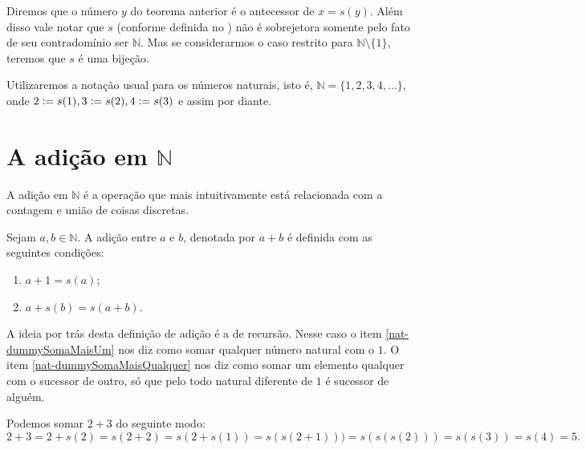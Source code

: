 \documentclass[../main.tex]{subfiles}
\begin{document}
\begin{obs}
    Diremos que o número $y$ do teorema anterior é o antecessor de $x = s(y)$. Além disso vale notar que $s$ (conforme definida no ) não é sobrejetora somente pelo fato de seu contradomínio ser $\mathbb{N}$. Mas se considerarmos o caso restrito para $\mathbb{N} \setminus \{1\}$, teremos que $s$ é uma bijeção.
\end{obs}

Utilizaremos a notação usual para os números naturais, isto é, $\mathbb{N} = \{ 1, 2, 3, 4, ...\}$, onde $2 \vcentcolon= s(1), 3 \vcentcolon= s(2), 4 \vcentcolon= s(3)$ e assim por diante.



\section{A adição em $\mathbb{N}$}
A adição em $\mathbb{N}$ é a operação que mais intuitivamente está relacionada com a contagem e união de coisas discretas.
\begin{defi}\label{nat-def-soma}
Sejam $a, b \in \mathbb{N}$. A adição entre $a$ e $b$, denotada por $a + b$ é definida com as seguintes condições: 
    \begin{enumerate}[label=(\roman*)]
        \item\label{nat-dummySomaMaisUm} $a + 1 = s(a)$;
        \item\label{nat-dummySomaMaisQualquer} $a + s(b) = s(a+b)$.
    \end{enumerate}
\end{defi}
A ideia por trás desta definição de adição é a de recursão. Nesse caso o item \ref{nat-dummySomaMaisUm} nos diz como somar qualquer número natural com o $1$. O item \ref{nat-dummySomaMaisQualquer} nos diz como somar um elemento qualquer com o sucessor de outro, só que pelo  todo natural diferente de $1$ é sucessor de alguém.
\begin{ex}
    Podemos somar $2 + 3$ do seguinte modo:
    \[ 2+3 = 2+s(2) = s(2+2) = s(2+s(1)) = s(s(2+1))) = s(s(s(2))) = s(s(3))=s(4)=5. \]
\end{ex}
\end{document}
